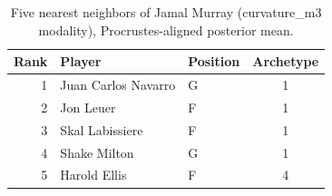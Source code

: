 \begin{table}[htbp]
  \centering\small
  \begin{tabular}{rllc}
    \toprule
    Rank & Player & Position & Archetype \\
    \midrule
    1 & Juan Carlos Navarro & G & 1 \\
    2 & Jon Leuer & F & 1 \\
    3 & Skal Labissiere & F & 1 \\
    4 & Shake Milton & G & 1 \\
    5 & Harold Ellis & F & 4 \\
    \bottomrule
  \end{tabular}
  \caption{Five nearest neighbors of Jamal Murray (curvature_m3 modality), Procrustes-aligned posterior mean.}
  \label{tab:Jamal_Murray_neighbors_curvature_m3}
\end{table}


